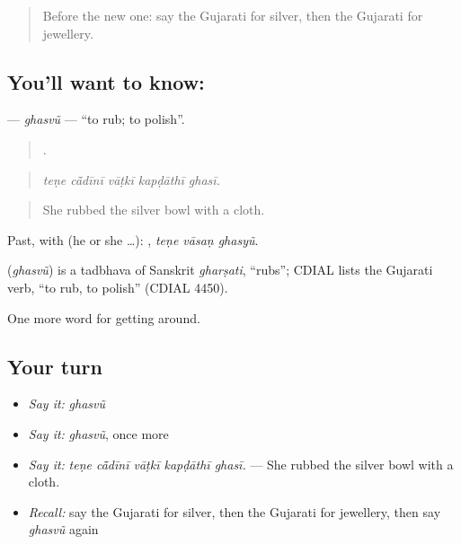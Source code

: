 \begin{quote}
Before the new one: say the Gujarati for silver, then the Gujarati for jewellery.
\end{quote}

\subsection*{You'll want to know: }
\textbf{} — \emph{ghasvũ} — \textquotedblleft{}to rub; to polish\textquotedblright{}.

\begin{quote}
    .
\end{quote}

\begin{quote}
\emph{teṇe cā̃dīnī vāṭkī kapḍāthī ghasī.}
\end{quote}

\begin{quote}
She rubbed the silver bowl with a cloth.
\end{quote}

Past, with  (he or she …):   , \emph{teṇe vāsaṇ ghasyũ}.

\begin{cousinweb}
\textbf{} (\emph{ghasvũ}) is a tadbhava of Sanskrit \emph{gharṣati}, \textquotedblleft{}rubs\textquotedblright{}; CDIAL lists the Gujarati verb, \textquotedblleft{}to rub, to polish\textquotedblright{} (CDIAL 4450).
\end{cousinweb}

\begin{grammarlens}[title={What you've built}]
One more word for getting around.
\end{grammarlens}

\subsection*{Your turn}
\begin{itemize}
\raggedright
  \item \emph{Say it:} \emph{ghasvũ}
  \item \emph{Say it:} \emph{ghasvũ}, once more
  \item \emph{Say it:} \emph{teṇe cā̃dīnī vāṭkī kapḍāthī ghasī.} — She rubbed the silver bowl with a cloth.
  \item \emph{Recall:} say the Gujarati for silver, then the Gujarati for jewellery, then say \emph{ghasvũ} again
\end{itemize}

